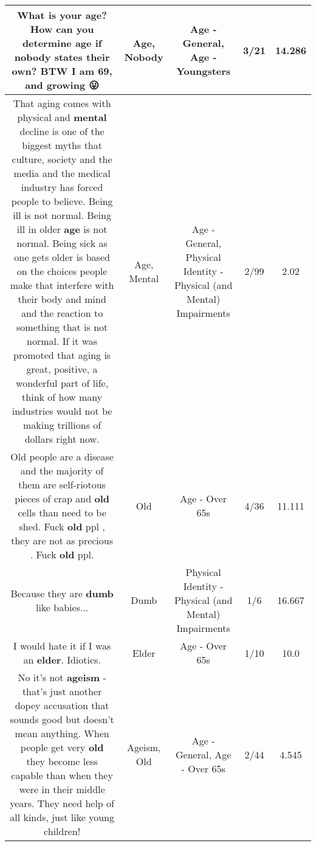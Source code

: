 \documentclass[11pt]{article}
\newlength\mylength
\begin{document}
\begin{center}
\begin{longtable}{|C{.65\mylength}|C{.30\mylength}|C{.12\mylength}|C{.12\mylength}|C{.12\mylength}|}
  \small What is your \textbf{age}?  How can you determine \textbf{age} if \textbf{nobody} states their own?  BTW I am 69,  and growing 😛\normalsize   & Age, Nobody & Age - General, Age - Youngsters & 3/21 & 14.286 \\  \hline
  \small That aging comes with physical and \textbf{mental} decline is one of the biggest myths that culture, society and the media and the medical industry has forced people to believe. Being ill is not normal. Being ill in older \textbf{age} is not normal. Being sick as one gets older is based on the choices people make that interfere with their body and mind and the reaction to something that is not normal. If it was promoted that aging is great, positive, a wonderful part of life, think of how many industries would not be making trillions of dollars right now.\normalsize   & Age, Mental & Age - General, Physical Identity - Physical (and Mental) Impairments & 2/99 & 2.02 \\  \hline
  \small Old people are a disease and the majority of them are self-riotous pieces of crap and \textbf{old} cells than need to be shed. Fuck \textbf{old} ppl , they are not as precious . Fuck \textbf{old} ppl.\normalsize   & Old & Age - Over 65s & 4/36 & 11.111 \\  \hline
  \small Because they are \textbf{dumb} like babies...\normalsize   & Dumb & Physical Identity - Physical (and Mental) Impairments & 1/6 & 16.667 \\  \hline
  \small I would hate it if I was an \textbf{elder}. Idiotics.\normalsize   & Elder & Age - Over 65s & 1/10 & 10.0 \\  \hline
  \small No it's not \textbf{ageism} - that's just another dopey accusation that sounds good but doesn't mean anything.  When people get very \textbf{old} they become less capable than when they were in their middle years.  They need help of all kinds, just like young children!\normalsize   & Ageism, Old & Age - General, Age - Over 65s & 2/44 & 4.545 \\  \hline

\end{longtable}
\end{center}
\end{document}
